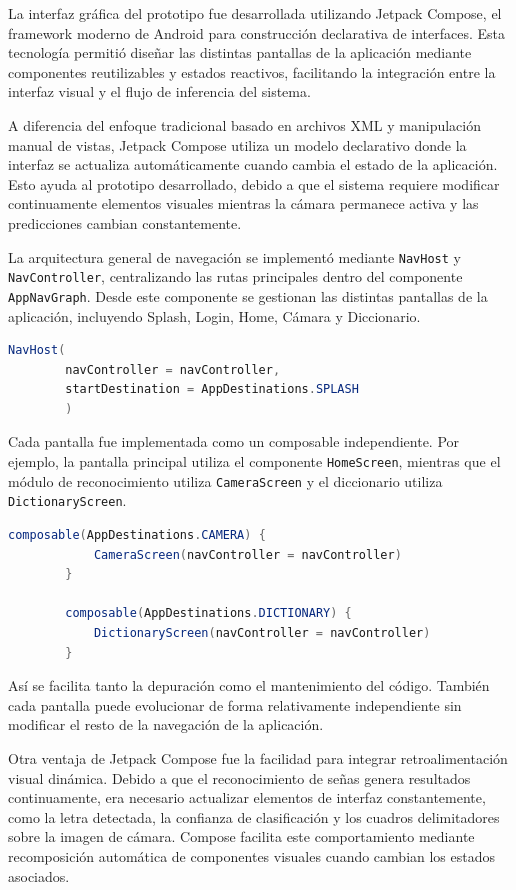 	La interfaz gráfica del prototipo fue desarrollada utilizando Jetpack Compose, el framework moderno de Android para construcción declarativa de interfaces. Esta tecnología permitió diseñar las distintas pantallas de la aplicación mediante componentes reutilizables y estados reactivos, facilitando la integración entre la interfaz visual y el flujo de inferencia del sistema.
	
	A diferencia del enfoque tradicional basado en archivos XML y manipulación manual de vistas, Jetpack Compose utiliza un modelo declarativo donde la interfaz se actualiza automáticamente cuando cambia el estado de la aplicación. Esto ayuda al prototipo desarrollado, debido a que el sistema requiere modificar continuamente elementos visuales mientras la cámara permanece activa y las predicciones cambian constantemente.
	
	La arquitectura general de navegación se implementó mediante \texttt{NavHost} y \texttt{NavController}, centralizando las rutas principales dentro del componente \texttt{AppNavGraph}. Desde este componente se gestionan las distintas pantallas de la aplicación, incluyendo Splash, Login, Home, Cámara y Diccionario.
	
	\begin{lstlisting}[language=Java]
		NavHost(
		navController = navController,
		startDestination = AppDestinations.SPLASH
		)
	\end{lstlisting}
	
	
	Cada pantalla fue implementada como un composable independiente. Por ejemplo, la pantalla principal utiliza el componente \texttt{HomeScreen}, mientras que el módulo de reconocimiento utiliza \texttt{CameraScreen} y el diccionario utiliza \texttt{DictionaryScreen}.
	
	\begin{lstlisting}[language=Java]
		composable(AppDestinations.CAMERA) {
			CameraScreen(navController = navController)
		}
		
		composable(AppDestinations.DICTIONARY) {
			DictionaryScreen(navController = navController)
		}
	\end{lstlisting}
	
	Así se facilita tanto la depuración como el mantenimiento del código. También cada pantalla puede evolucionar de forma relativamente independiente sin modificar el resto de la navegación de la aplicación.
	
	Otra ventaja de Jetpack Compose fue la facilidad para integrar retroalimentación visual dinámica. Debido a que el reconocimiento de señas genera resultados continuamente, era necesario actualizar elementos de interfaz constantemente, como la letra detectada, la confianza de clasificación y los cuadros delimitadores sobre la imagen de cámara. Compose facilita este comportamiento mediante recomposición automática de componentes visuales cuando cambian los estados asociados.
	
